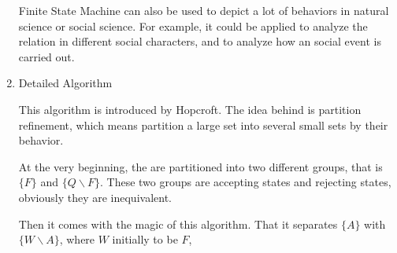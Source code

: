 \documentclass{article}
\begin{document}
\begin{enumerate}
Finite State Machine can also be used to depict a lot of behaviors in natural science or social science. For example, it could be applied to analyze the relation in different social characters, and to analyze how an social event is carried out.


\item Detailed Algorithm

This algorithm is introduced by Hopcroft. The idea behind is partition refinement, which means partition a large set into several small sets by their behavior. 

At the very beginning, the are partitioned into two different groups, that is $\{F\}$ and $\{Q\backslash F\}$. These two groups are accepting states and rejecting states, obviously they are inequivalent.

Then it comes with the magic of this algorithm. That it separates $\{A\}$ with $\{W\backslash A\}$, where $W$ initially to be $F$, 

\begin{Algorithm}[FSM minimization\label{problem74}]
	\BlankLine

	\Ret

\end{Algorithm}
\end{enumerate}
\end{document}
